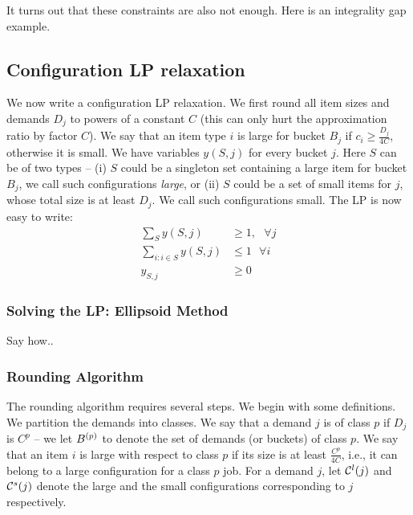 It turns out that these constraints are also not enough. Here is an integrality gap example.


\subsection{Configuration LP relaxation}
We now write a configuration LP relaxation. We first round all item sizes and demands $D_j$ to powers of a constant $C$ (this
can only hurt the approximation ratio by factor $C$).  We say that an item type $i$ is large for bucket $B_j$ if $c_i \geq \frac{D_j}{4C}$, otherwise it is small.
We have variables $y(S,j)$ for every bucket $j$. Here $S$ can be of two types -- (i) $S$ could be a singleton set containing a large item for bucket $B_j$, we call such configurations {\em large}, or (ii) $S$ could be a set of small items for $j$, whose total size is at least $D_j$.
We call such configurations small. The LP is now easy to write:
\begin{align*}
\sum_{S} y(S,j) & \geq 1, \ \ \ \forall j \\
\sum_{i: i \in S} y(S,j) & \leq 1 \ \ \ \forall i \\
y_{S,j} & \geq 0
\end{align*}

\subsubsection{Solving the LP: Ellipsoid Method}
Say how..

\subsubsection{Rounding Algorithm}

The rounding algorithm requires several steps. We begin with some definitions. We partition the demands into classes.
We say that a demand $j$ is of class $p$ if
$D_j$ is $C^p$ -- we let $B^{(p)}$ to denote the set of demands (or buckets) of class $p$.
We say that an item $i$ is large with respect to class $p$ if its size is at least $\frac{C^p}{4C}$, i.e., it can belong to a large configuration for a class $p$ job.  For a demand $j$, let ${\cal C}^l(j)$ and ${\cal C}^s(j)$ denote the large and the small configurations corresponding to $j$ respectively.

